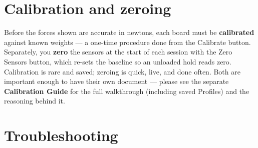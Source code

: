 \documentclass[11pt,a4paper]{article}
\begin{document}

\section{Calibration and zeroing}

Before the forces shown are accurate in newtons, each board must be
\textbf{calibrated} against known weights --- a one-time procedure done from the
\textsf{Calibrate} button. Separately, you \textbf{zero} the sensors at the start of
each session with the \textsf{Zero Sensors} button, which re-sets the baseline so an
unloaded hold reads zero. Calibration is rare and saved; zeroing is quick, live, and
done often. Both are important enough to have their own document --- please see the
separate \textbf{Calibration Guide} for the full walkthrough (including saved
\textsf{Profiles}) and the reasoning behind it.

\section{Troubleshooting}
\end{document}
